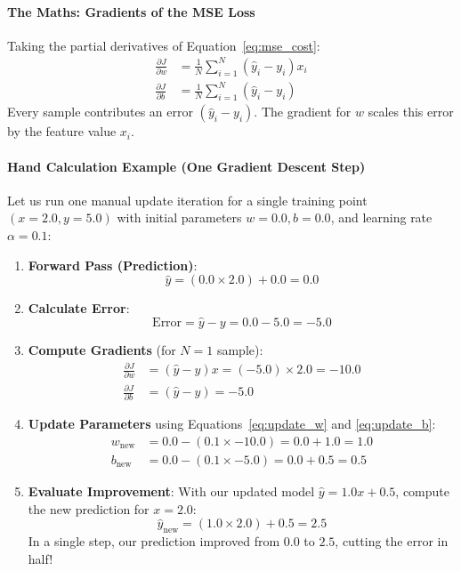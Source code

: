 \paragraph{The Maths: Gradients of the MSE Loss}
Taking the partial derivatives of Equation~\ref{eq:mse_cost}:
\begin{align}
\frac{\partial J}{\partial w} &= \frac{1}{N} \sum_{i=1}^N (\hat{y}_i - y_i) x_i\label{eq:grad_w} \\
\frac{\partial J}{\partial b} &= \frac{1}{N} \sum_{i=1}^N (\hat{y}_i - y_i)\label{eq:grad_b}
\end{align}
Every sample contributes an error $(\hat{y}_i - y_i)$. The gradient for $w$ scales this error by the feature value $x_i$.

\paragraph{Hand Calculation Example (One Gradient Descent Step)}
Let us run one manual update iteration for a single training point $(x = 2.0, y = 5.0)$ with initial parameters $w = 0.0, b = 0.0$, and learning rate $\alpha = 0.1$:
\begin{enumerate}
    \item \textbf{Forward Pass (Prediction)}:
    \begin{equation*}
    \hat{y} = (0.0 \times 2.0) + 0.0 = 0.0
    \end{equation*}
    \item \textbf{Calculate Error}:
    \begin{equation*}
    \text{Error} = \hat{y} - y = 0.0 - 5.0 = -5.0
    \end{equation*}
    \item \textbf{Compute Gradients} (for $N = 1$ sample):
    \begin{align*}
    \frac{\partial J}{\partial w} &= (\hat{y} - y) x = (-5.0) \times 2.0 = -10.0 \\
    \frac{\partial J}{\partial b} &= (\hat{y} - y) = -5.0
    \end{align*}
    \item \textbf{Update Parameters} using Equations~\ref{eq:update_w} and \ref{eq:update_b}:
    \begin{align*}
    w_{\text{new}} &= 0.0 - (0.1 \times -10.0) = 0.0 + 1.0 = 1.0 \\
    b_{\text{new}} &= 0.0 - (0.1 \times -5.0) = 0.0 + 0.5 = 0.5
    \end{align*}
    \item \textbf{Evaluate Improvement}:
    With our updated model $\hat{y} = 1.0 x + 0.5$, compute the new prediction for $x = 2.0$:
    \begin{equation*}
    \hat{y}_{\text{new}} = (1.0 \times 2.0) + 0.5 = 2.5
    \end{equation*}
    In a single step, our prediction improved from $0.0$ to $2.5$, cutting the error in half!
\end{enumerate}

